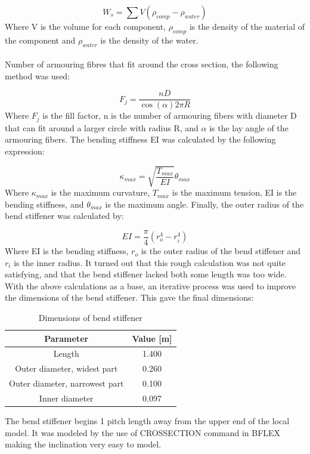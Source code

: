 \begin{equation}
   W_s = \sum V (\rho_{comp}-\rho_{water})
\end{equation}
 Where V is the volume for each component, $\rho_{comp}$ is the density of the material of the component and $\rho_{water}$ is the density of the water.\\\\ Number of armouring fibres that fit around the cross section, the following method was used: 

 \begin{equation}
   F_j=\frac{n D}{\cos{(\alpha)} 2 \pi R}
\end{equation}
Where $F_j$ is the fill factor, n is the number of armouring fibers with diameter D  that can fit around a larger circle with radius R, and $\alpha$ is the lay angle of the armouring fibers.  \newline
\newline 
The bending stiffness EI was calculated by the following expression:

 \begin{equation}
   \kappa_{max} = \sqrt{\frac{T_{max}}{EI}}\theta_{max}
\end{equation}
Where $\kappa_{max}$ is the maximum curvature, $T_{max}$ is the maximum tension, EI is the bending stiffness, and $\theta_{max}$ is the maximum angle.\newline  
\newline 
\noindent Finally, the outer radius of the bend stiffener was calculated by:

 \begin{equation}
  EI = \frac{\pi}{4}(r_o^4 - r_i^4) 
\end{equation}
 Where EI is the bending stiffness, $r_o$ is the outer radius of the bend stiffener and $r_i$ is the inner radius.\newline 
\newline 
It turned out that this rough calculation was not quite satisfying, and that the bend stiffener lacked both some length was too wide. With the above calculations as a base, an iterative process was used to improve the dimensions of the bend stiffener. This gave the final dimensions: 
 \begin{table} [H]
\centering
\begin{tabular}{ |c|c|}
\hline
Parameter & Value [m] \\
 \hline
 \hline
 
 Length & 1.400 \\
 
Outer diameter, widest part & 0.260\\

Outer diameter, narrowest part & 0.100\\

 Inner diameter & 0.097 \\
 

 \hline
\end{tabular}
\caption{Dimensions of bend stiffener}
\label{table:dim}
\end{table}
\noindent The bend stiffener begins 1 pitch length away from the upper end of the local model. It was modeled by the use of CROSSECTION command in BFLEX making the inclination very easy to model.  

